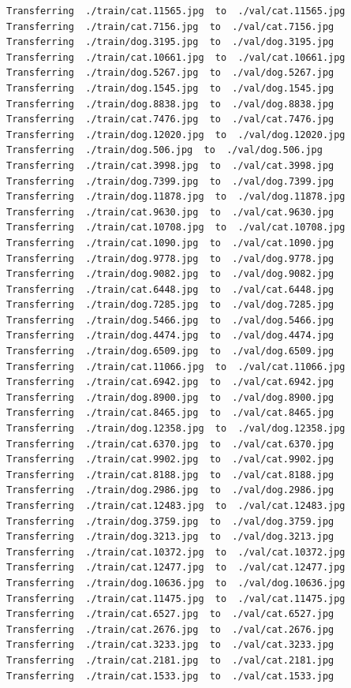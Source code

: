 \documentclass[]{book}
\theoremstyle{definition}
\theoremstyle{definition}
\theoremstyle{definition}
\theoremstyle{remark}
\begin{document}
\begin{verbatim}
Transferring  ./train/cat.11565.jpg  to  ./val/cat.11565.jpg
Transferring  ./train/cat.7156.jpg  to  ./val/cat.7156.jpg
Transferring  ./train/dog.3195.jpg  to  ./val/dog.3195.jpg
Transferring  ./train/cat.10661.jpg  to  ./val/cat.10661.jpg
Transferring  ./train/dog.5267.jpg  to  ./val/dog.5267.jpg
Transferring  ./train/dog.1545.jpg  to  ./val/dog.1545.jpg
Transferring  ./train/dog.8838.jpg  to  ./val/dog.8838.jpg
Transferring  ./train/cat.7476.jpg  to  ./val/cat.7476.jpg
Transferring  ./train/dog.12020.jpg  to  ./val/dog.12020.jpg
Transferring  ./train/dog.506.jpg  to  ./val/dog.506.jpg
Transferring  ./train/cat.3998.jpg  to  ./val/cat.3998.jpg
Transferring  ./train/dog.7399.jpg  to  ./val/dog.7399.jpg
Transferring  ./train/dog.11878.jpg  to  ./val/dog.11878.jpg
Transferring  ./train/cat.9630.jpg  to  ./val/cat.9630.jpg
Transferring  ./train/cat.10708.jpg  to  ./val/cat.10708.jpg
Transferring  ./train/cat.1090.jpg  to  ./val/cat.1090.jpg
Transferring  ./train/dog.9778.jpg  to  ./val/dog.9778.jpg
Transferring  ./train/dog.9082.jpg  to  ./val/dog.9082.jpg
Transferring  ./train/cat.6448.jpg  to  ./val/cat.6448.jpg
Transferring  ./train/dog.7285.jpg  to  ./val/dog.7285.jpg
Transferring  ./train/dog.5466.jpg  to  ./val/dog.5466.jpg
Transferring  ./train/dog.4474.jpg  to  ./val/dog.4474.jpg
Transferring  ./train/dog.6509.jpg  to  ./val/dog.6509.jpg
Transferring  ./train/cat.11066.jpg  to  ./val/cat.11066.jpg
Transferring  ./train/cat.6942.jpg  to  ./val/cat.6942.jpg
Transferring  ./train/dog.8900.jpg  to  ./val/dog.8900.jpg
Transferring  ./train/cat.8465.jpg  to  ./val/cat.8465.jpg
Transferring  ./train/dog.12358.jpg  to  ./val/dog.12358.jpg
Transferring  ./train/cat.6370.jpg  to  ./val/cat.6370.jpg
Transferring  ./train/cat.9902.jpg  to  ./val/cat.9902.jpg
Transferring  ./train/cat.8188.jpg  to  ./val/cat.8188.jpg
Transferring  ./train/dog.2986.jpg  to  ./val/dog.2986.jpg
Transferring  ./train/cat.12483.jpg  to  ./val/cat.12483.jpg
Transferring  ./train/dog.3759.jpg  to  ./val/dog.3759.jpg
Transferring  ./train/dog.3213.jpg  to  ./val/dog.3213.jpg
Transferring  ./train/cat.10372.jpg  to  ./val/cat.10372.jpg
Transferring  ./train/cat.12477.jpg  to  ./val/cat.12477.jpg
Transferring  ./train/dog.10636.jpg  to  ./val/dog.10636.jpg
Transferring  ./train/cat.11475.jpg  to  ./val/cat.11475.jpg
Transferring  ./train/cat.6527.jpg  to  ./val/cat.6527.jpg
Transferring  ./train/cat.2676.jpg  to  ./val/cat.2676.jpg
Transferring  ./train/cat.3233.jpg  to  ./val/cat.3233.jpg
Transferring  ./train/cat.2181.jpg  to  ./val/cat.2181.jpg
Transferring  ./train/cat.1533.jpg  to  ./val/cat.1533.jpg

\end{verbatim}
\end{document}
